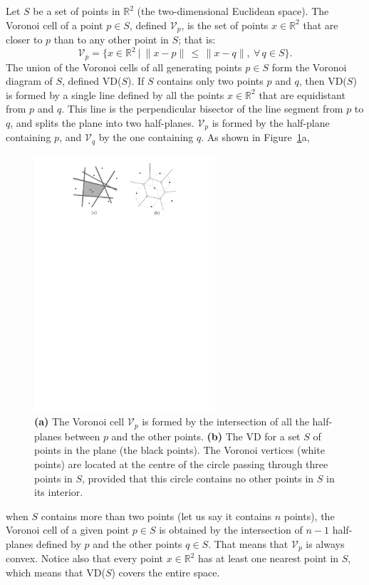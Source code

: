 Let $S$ be a set of points in $\mathbb{R}^2$ (the two-dimensional Euclidean space). 
The Voronoi cell of a point $p \in S$, defined $\mathcal{V}_{p}$, is the set of points $x \in \mathbb{R}^2$ that are closer to $p$ than to any other point in $S$; that is:
\begin{equation}
\mathcal{V}_p = \{x \in \mathbb{R}^{2} \ | \ \|x-p\| \, \leq \, \|x-q\|, \ \forall \, q \in S \}. 
\end{equation}
The union of the Voronoi cells of all generating points $p \in S$ form the Voronoi diagram of $S$, defined VD($S$). 
If $S$ contains only two points $p$ and $q$, then VD($S$) is formed by a single line defined by all the points $x \in \mathbb{R}^2$ that are equidistant from $p$ and $q$. 
This line is the perpendicular bisector of the line segment from $p$ to $q$, and splits the plane into two half-planes. 
$\mathcal{V}_p$ is formed by the half-plane containing $p$, and $\mathcal{V}_q$ by the one containing $q$. 
As shown in Figure~\ref{fig:halfspaces}a,
\begin{figure}
  \centering
  \includegraphics[width=0.6\textwidth]{figs/halfspaces}
  \caption{\textbf{(a)} The Voronoi cell $\mathcal{V}_p$ is formed by the intersection of all the half-planes between $p$ and the other points. \textbf{(b)} The VD for a set $S$ of points in the plane (the black points). The Voronoi vertices (white points) are located at the centre of the circle passing through three points in $S$, provided that this circle contains no other points in $S$ in its interior.} 
\label{fig:halfspaces}
\end{figure}
when $S$ contains more than two points (let us say it contains $n$ points), the Voronoi cell of a given point $p \in S$ is obtained by the intersection of $n-1$ half-planes defined by $p$ and the other points $q \in S$. 
That means that $\mathcal{V}_{p}$ is always convex. 
Notice also that every point $x \in \mathbb{R}^2$ has at least one nearest point in $S$, which means that VD($S$) covers the entire space.

